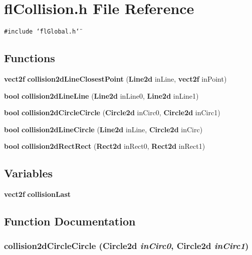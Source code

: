 \section{fl\-Collision.h File Reference}
\label{flCollision_8h}
{\tt \#include \char`\"{}fl\-Global.h\char`\"{}}\par
\subsection*{Functions}
\begin{CompactItemize}
\item 
{\bf vect2f} {\bf collision2d\-Line\-Closest\-Point} ({\bf Line2d} in\-Line, {\bf vect2f} in\-Point)
\item 
{\bf bool} {\bf collision2d\-Line\-Line} ({\bf Line2d} in\-Line0, {\bf Line2d} in\-Line1)
\item 
{\bf bool} {\bf collision2d\-Circle\-Circle} ({\bf Circle2d} in\-Circ0, {\bf Circle2d} in\-Circ1)
\item 
{\bf bool} {\bf collision2d\-Line\-Circle} ({\bf Line2d} in\-Line, {\bf Circle2d} in\-Circ)
\item 
{\bf bool} {\bf collision2d\-Rect\-Rect} ({\bf Rect2d} in\-Rect0, {\bf Rect2d} in\-Rect1)
\end{CompactItemize}
\subsection*{Variables}
\begin{CompactItemize}
\item 
{\bf vect2f} {\bf collision\-Last}
\end{CompactItemize}


\subsection{Function Documentation}
\subsubsection{ collision2d\-Circle\-Circle ({\bf Circle2d} {\em in\-Circ0}, {\bf Circle2d} {\em in\-Circ1})}\label{flCollision_8h_6a13d562d73bdbdbe4578c16fbc2d3b7}





